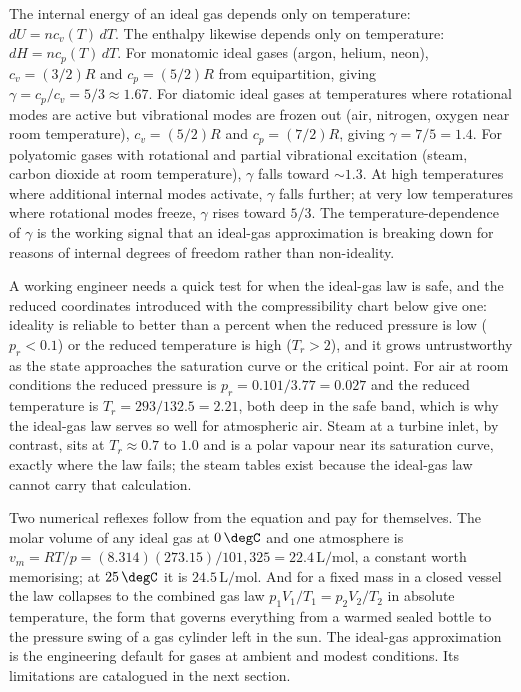 The internal energy of an ideal gas depends only on temperature:
$dU = n c_v(T) \,dT$. The enthalpy likewise depends only on
temperature: $dH = n c_p(T) \,dT$. For monatomic ideal gases (argon,
helium, neon), $c_v = (3/2) R$ and $c_p = (5/2) R$ from equipartition,
giving $\gamma = c_p/c_v = 5/3 \approx 1.67$. For diatomic ideal gases
at temperatures where rotational modes are active but vibrational
modes are frozen out (air, nitrogen, oxygen near room temperature),
$c_v = (5/2) R$ and $c_p = (7/2) R$, giving $\gamma = 7/5 = 1.4$. For
polyatomic gases with rotational and partial vibrational excitation
(steam, carbon dioxide at room temperature), $\gamma$ falls toward
$\sim 1.3$. At high temperatures where additional internal modes
activate, $\gamma$ falls further; at very low temperatures where
rotational modes freeze, $\gamma$ rises toward $5/3$. The
temperature-dependence of $\gamma$ is the working signal that an
ideal-gas approximation is breaking down for reasons of internal
degrees of freedom rather than non-ideality.

A working engineer needs a quick test for when the ideal-gas law is
safe, and the reduced coordinates introduced with the compressibility
chart below give one: ideality is reliable to better than a percent when
the reduced pressure is low ($p_r < 0.1$) or the reduced temperature is
high ($T_r > 2$), and it grows untrustworthy as the state approaches the
saturation curve or the critical point. For air at room conditions the
reduced pressure is $p_r = 0.101/3.77 = 0.027$ and the reduced
temperature is $T_r = 293/132.5 = 2.21$, both deep in the safe band,
which is why the ideal-gas law serves so well for atmospheric air. Steam
at a turbine inlet, by contrast, sits at $T_r \approx 0.7$ to $1.0$ and
is a polar vapour near its saturation curve, exactly where the law fails;
the steam tables exist because the ideal-gas law cannot carry that
calculation.

Two numerical reflexes follow from the equation and pay for themselves.
The molar volume of any ideal gas at $0\,\degC$ and one atmosphere is
$v_m = RT/p = (8.314)(273.15)/101{,}325 = 22.4\,\text{L}/\text{mol}$, a
constant worth memorising; at $25\,\degC$ it is $24.5\,\text{L}/\text{mol}$.
And for a fixed mass in a closed vessel the law collapses to the
combined gas law $p_1 V_1/T_1 = p_2 V_2/T_2$ in absolute temperature, the
form that governs everything from a warmed sealed bottle to the pressure
swing of a gas cylinder left in the sun. The ideal-gas approximation is
the engineering default for gases at ambient and modest conditions. Its
limitations are catalogued in the next section.

